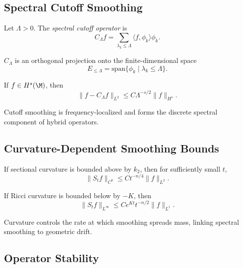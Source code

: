 \subsection{Spectral Cutoff Smoothing}

\begin{definition}
Let $\Lambda > 0$.  
The \emph{spectral cutoff operator} is
\[
C_\Lambda f = \sum_{\lambda_k \le \Lambda} \langle f, \phi_k \rangle \phi_k.
\]
\end{definition}

\begin{lemma}
$C_\Lambda$ is an orthogonal projection onto the finite-dimensional space
\[
E_{\le \Lambda} = \mathrm{span}\{\phi_k \mid \lambda_k \le \Lambda\}.
\]
\end{lemma}

\begin{theorem}
If $f \in H^s(\M)$, then
\[
\|f - C_\Lambda f\|_{L^2}
\le C \Lambda^{-s/2} \|f\|_{H^s}.
\]
\end{theorem}

\begin{remark}
Cutoff smoothing is frequency-localized and forms the discrete spectral
component of hybrid operators.
\end{remark}

\subsection{Curvature-Dependent Smoothing Bounds}

\begin{lemma}
If sectional curvature is bounded above by $k_2$, then for sufficiently
small $t$,
\[
\|S_t f\|_{C^0}
\le C t^{-n/4} \|f\|_{L^2}.
\]
\end{lemma}

\begin{theorem}
If Ricci curvature is bounded below by $-K$, then
\[
\|S_t f\|_{L^\infty}
\le C e^{Kt} t^{-n/2} \|f\|_{L^1}.
\]
\end{theorem}

\begin{remark}
Curvature controls the rate at which smoothing spreads mass, linking
spectral smoothing to geometric drift.
\end{remark}

\subsection{Operator Stability}

